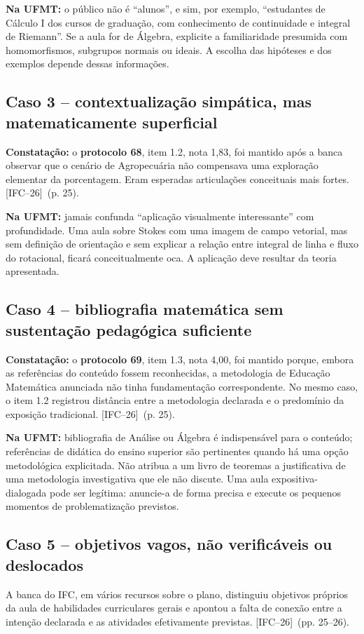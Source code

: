 \documentclass[11pt,a4paper]{article}
\newcommand{\fifc}{\textsf{[IFC--26]}}
\begin{document}
\textbf{Na UFMT:} o público não é ``alunos'', e sim, por exemplo, ``estudantes de Cálculo I dos cursos de graduação, com conhecimento de continuidade e integral de Riemann''. Se a aula for de Álgebra, explicite a familiaridade presumida com homomorfismos, subgrupos normais ou ideais. A escolha das hipóteses e dos exemplos depende dessas informações.

\subsection{Caso 3 -- contextualização simpática, mas matematicamente superficial}
\textbf{Constatação:} o \textbf{protocolo 68}, item 1.2, nota 1,83, foi mantido após a banca observar que o cenário de Agropecuária não compensava uma exploração elementar da porcentagem. Eram esperadas articulações conceituais mais fortes. \fifc\ (p. 25).

\textbf{Na UFMT:} jamais confunda ``aplicação visualmente interessante'' com profundidade. Uma aula sobre Stokes com uma imagem de campo vetorial, mas sem definição de orientação e sem explicar a relação entre integral de linha e fluxo do rotacional, ficará conceitualmente oca. A aplicação deve resultar da teoria apresentada.

\subsection{Caso 4 -- bibliografia matemática sem sustentação pedagógica suficiente}
\textbf{Constatação:} o \textbf{protocolo 69}, item 1.3, nota 4,00, foi mantido porque, embora as referências do conteúdo fossem reconhecidas, a metodologia de Educação Matemática anunciada não tinha fundamentação correspondente. No mesmo caso, o item 1.2 registrou distância entre a metodologia declarada e o predomínio da exposição tradicional. \fifc\ (p. 25).

\textbf{Na UFMT:} bibliografia de Análise ou Álgebra é indispensável para o conteúdo; referências de didática do ensino superior são pertinentes quando há uma opção metodológica explicitada. Não atribua a um livro de teoremas a justificativa de uma metodologia investigativa que ele não discute. Uma aula expositiva-dialogada pode ser legítima: anuncie-a de forma precisa e execute os pequenos momentos de problematização previstos.

\subsection{Caso 5 -- objetivos vagos, não verificáveis ou deslocados}
A banca do IFC, em vários recursos sobre o plano, distinguiu objetivos próprios da aula de habilidades curriculares gerais e apontou a falta de conexão entre a intenção declarada e as atividades efetivamente previstas. \fifc\ (pp. 25--26).
\end{document}
